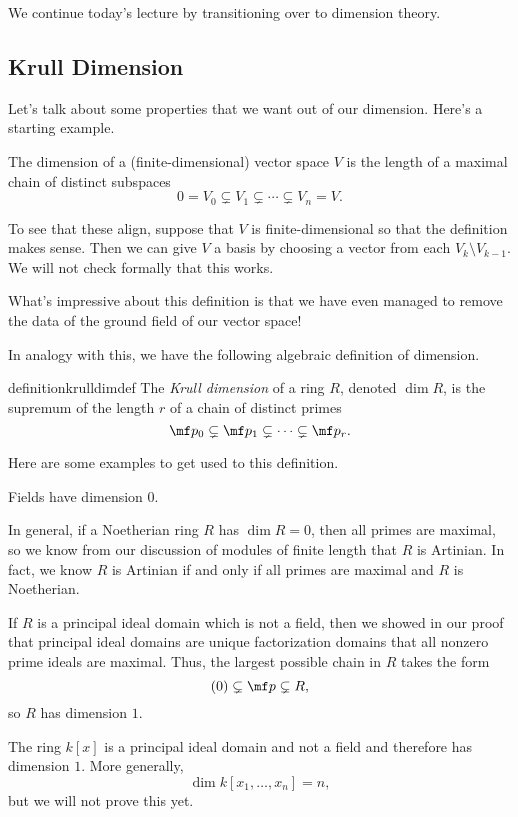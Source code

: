 \documentclass[../notes.tex]{subfiles}
\begin{document}

We continue today's lecture by transitioning over to dimension theory.

\subsection{Krull Dimension}
Let's talk about some properties that we want out of our dimension. Here's a starting example.
\begin{defi}
	The dimension of a (finite-dimensional) vector space $V$ is the length of a maximal chain of distinct subspaces
	\[0=V_0\subsetneq V_1\subsetneq\cdots\subsetneq V_n=V.\]
\end{defi}
\begin{remark}
	To see that these align, suppose that $V$ is finite-dimensional so that the definition makes sense. Then we can give $V$ a basis by choosing a vector from each $V_k\setminus V_{k-1}$. We will not check formally that this works.
\end{remark}
What's impressive about this definition is that we have even managed to remove the data of the ground field of our vector space!

In analogy with this, we have the following algebraic definition of dimension.
\begin{restatable}{definition}{krulldimdef} \label{def:krulldim}
	The \textit{Krull dimension} of a ring $R$, denoted $\dim R$, is the supremum of the length $r$ of a chain of distinct primes
	\[\mf p_0\subsetneq\mf p_1\subsetneq\cdots\subsetneq\mf p_r.\]
\end{restatable}
Here are some examples to get used to this definition.
\begin{example}
	Fields have dimension $0$.
\end{example}
\begin{example}
	In general, if a Noetherian ring $R$ has $\dim R=0$, then all primes are maximal, so we know from our discussion of modules of finite length that $R$ is Artinian. In fact, we know $R$ is Artinian if and only if all primes are maximal and $R$ is Noetherian.
\end{example}
\begin{example}
	If $R$ is a principal ideal domain which is not a field, then we showed in our proof that principal ideal domains are unique factorization domains that all nonzero prime ideals are maximal. Thus, the largest possible chain in $R$ takes the form
	\[(0)\subsetneq\mf p\subsetneq R,\]
	so $R$ has dimension $1$.
\end{example}
\begin{example}
	The ring $k[x]$ is a principal ideal domain and not a field and therefore has dimension $1$. More generally,
	\[\dim k[x_1,\ldots,x_n]=n,\]
	but we will not prove this yet.
\end{example}
\end{document}
